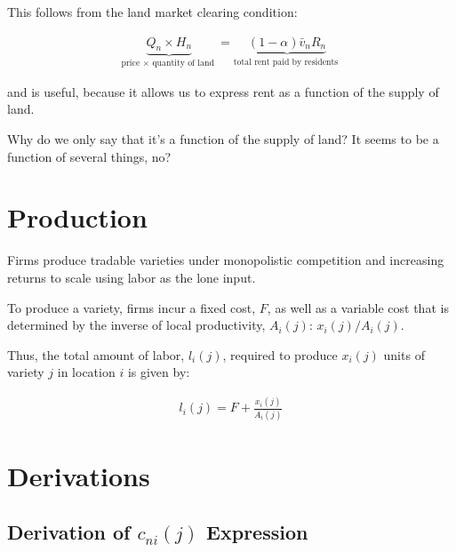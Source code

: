 \documentclass[10pt]{article}
\begin{document}
This follows from the land market clearing condition:

\begin{align}
    \underbrace{Q_n \times H_n}_{\text {price } \times \text { quantity of land }}=\underbrace{(1-\alpha) \bar{v}_n R_n}_{\text {total rent paid by residents }}
\end{align}

and is useful, because it allows us to express 
rent as a function of the supply of land.

\begin{questions}
    Why do we only say that it's a function of the supply of land?
    It seems to be a function of several things, no?
\end{questions}



\section{Production}

Firms produce tradable varieties under 
monopolistic competition
and increasing returns to scale
using labor as the lone input. 

To produce a variety, firms incur 
a fixed cost, $F$, as well as a 
variable cost
that is determined by the inverse 
of local productivity, $A_i(j)$: $x_i(j)/A_i(j)$.

Thus, the total amount of labor, $l_i(j)$, required to produce
$x_i(j)$ units of variety $j$ in location $i$ is
given by:

\begin{align}
    l_i(j)=F+ \frac{x_i(j)}{A_i(j)}
\end{align}


\section{Derivations}

\subsection{Derivation of $c_{n i}(j)$ Expression} 
\label{sec:good_nij_consumption}
\end{document}
